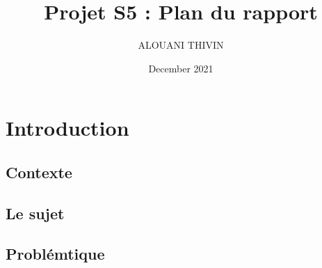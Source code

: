 \documentclass{article}
\title{Projet S5 : Plan du rapport}
\author{ALOUANI THIVIN}
\date{December 2021}
\begin{document}
\maketitle

\tableofcontents
\newpage
\section{Introduction}
    {
    \subsection{Contexte}
    
    \subsection{Le sujet}
    
    
    \subsection{Problémtique}
    
    }




\newpage
\end{document}
